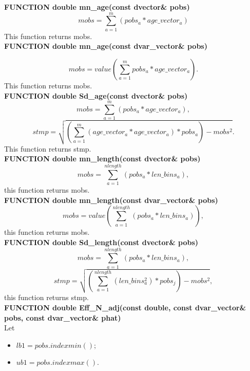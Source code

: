 \documentclass{article}
\begin{document}
\textbf{FUNCTION double mn\_age(const dvector\& pobs)}
\begin{equation}
    mobs = \sum_{a=1}^m(pobs_a*age\_vector_a)
\end{equation}
This function returns mobs.\\

\textbf{FUNCTION double mn\_age(const dvar\_vector\& pobs)}

\begin{equation}
    mobs = value\left(\sum_{a=1}^m pobs_a*age\_vector_a\right).
\end{equation}
This function returns mobs.\\

\textbf{FUNCTION double Sd\_age(const dvector\& pobs)}\\
\begin{equation}
    mobs = \sum_{a=1}^m(pobs_a*age\_vector_a),
\end{equation}
\begin{equation}
    stmp = \sqrt{\left(\sum_{a=1}^m(age\_vector_a*age\_vector_a)*pobs_a\right) - mobs^2}.
\end{equation}
This function returns stmp.\\
\textbf{FUNCTION double mn\_length(const dvector\& pobs)}\\
\begin{equation}
    mobs = \sum_{a=1}^{nlength}(pobs_a*len\_bins_a),
\end{equation}
this function returns mobs.\\
\textbf{FUNCTION double mn\_length(const dvar\_vector\& pobs)}\\
\begin{equation}
    mobs = value\left(\sum_{a=1}^{nlength}(pobs_a*len\_bins_a)\right),
\end{equation}
this function returns mobs.\\

\textbf{FUNCTION double Sd\_length(const dvector\& pobs)}\\
\begin{equation}
    mobs = \sum_{a=1}^{nlength}(pobs_a*len\_bins_a),
\end{equation}
\begin{equation}
    stmp = \sqrt{\left(\sum_{a=1}^{nlength}(len\_bins_a^2)*pobs_j\right) - mobs^2},
\end{equation}
this function returns stmp.\\

\textbf{FUNCTION double Eff\_N\_adj(const double, const dvar\_vector\& pobs, const dvar\_vector\& phat)}\\
Let
\begin{itemize}
    \item $lb1 = pobs.indexmin();$
    \item $ub1 = pobs.indexmax().$
\end{itemize}
\end{document}
